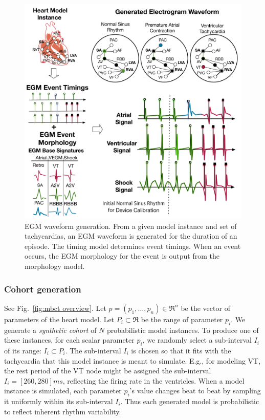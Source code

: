 \begin{figure}[t]
	\centering
	\includegraphics[scale=0.3]{figures/figEGMGeneration1column.pdf}
	\vspace{-15pt}
	\caption{\small \ac{EGM} waveform generation.
		From a given model instance and set of tachycardias, an EGM waveform is generated for the duration of an episode. The timing model determines event timings. When an event occurs, the EGM morphology for the event is output from the morphology model.  
		}
	\vspace{-15pt}
	\label{fig:egmGeneration}
\end{figure}



\subsubsection{Cohort generation}
\label{sec:cohort generation}
See Fig.~\ref{fig:mbct overview}.
Let $p = (p_1,\ldots,p_n) \in \Re^n$ be the vector of parameters of the heart model.
Let $P_i \subset \Re$ be the range of parameter $p_i$.
We generate a \emph{synthetic cohort} of $N$ probabilistic model instances.
To produce one of these instances, for each scalar parameter $p_i$, we randomly select a sub-interval $I_i$ of its range: $I_i \subset P_i$.
The sub-interval $I_i$ is chosen so that it fits with the tachycardia that this model instance is meant to simulate.
E.g., for modeling \ac{VT}, the rest period of the \ac{VT} node might be assigned the sub-interval $I_i = [260, 280]ms$, reflecting the firing rate in the ventricles.
When a model instance is simulated, each parameter $p_i$'s value changes beat to beat by sampling it uniformly within its sub-interval $I_i$.
Thus each generated model is probabilistic to reflect inherent rhythm variability.